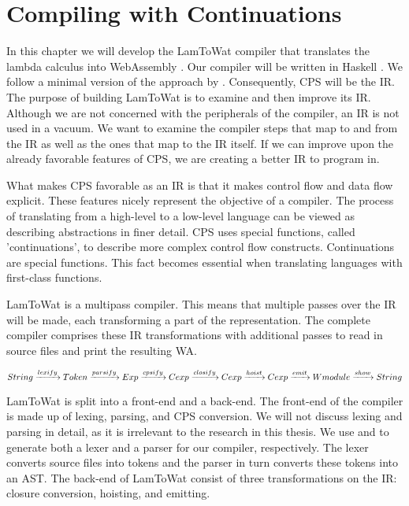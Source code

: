 
\chapter{\label{chap:cpscomp}Compiling with Continuations}
In this chapter we will develop the LamToWat compiler that translates the lambda calculus into WebAssembly \autocite{webassemblyhomepage}. Our compiler will be written in Haskell \autocite{haskellhomepage}. We follow a minimal version of the approach by \citeauthor{DBLP:books/daglib/0022396}. Consequently, \ac{CPS} will be the \ac{IR}. The purpose of building LamToWat is to examine and then improve its \ac{IR}. Although we are not concerned with the peripherals of the compiler, an \ac{IR} is not used in a vacuum. We want to examine the compiler steps that map to and from the \ac{IR} as well as the ones that map to the \ac{IR} itself. If we can improve upon the already favorable features of \ac{CPS}, we are creating a better IR to program in.

What makes \ac{CPS} favorable as an \ac{IR} is that it makes control flow and data flow explicit. These features nicely represent the objective of a compiler. The process of translating from a high-level to a low-level language can be viewed as describing abstractions in finer detail. \ac{CPS} uses special functions, called 'continuations', to describe more complex control flow constructs. Continuations are special functions. This fact becomes essential when translating languages with first-class functions.

LamToWat is a multipass compiler. This means that multiple passes over the \ac{IR} will be made, each transforming a part of the representation. The complete compiler comprises these \ac{IR} transformations with additional passes to read in source files and print the resulting \ac{WA}.

\begin{equation*}
  String \xrightarrow{lexify} Token \xrightarrow{parsify} Exp \xrightarrow{cpsify} Cexp \xrightarrow{closify} Cexp \xrightarrow{hoist} Cexp \xrightarrow{emit} Wmodule \xrightarrow{show} String
\end{equation*}

LamToWat is split into a front-end and a back-end. The front-end of the compiler is made up of lexing, parsing, and \ac{CPS} conversion. We will not discuss lexing and parsing in detail, as it is irrelevant to the research in this thesis. We use \autocite{haskellalex} and \autocite{haskellhappy} to generate both a lexer and a parser for our compiler, respectively. The lexer converts source files into tokens and the parser in turn converts these tokens into an \ac{AST}. The back-end of LamToWat consist of three transformations on the \ac{IR}: closure conversion, hoisting, and emitting.

